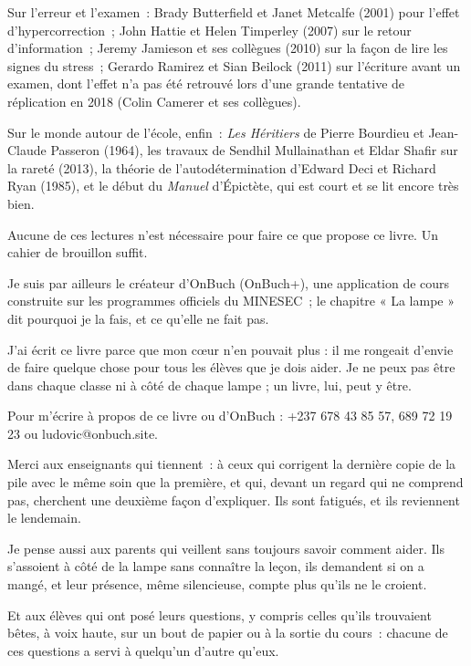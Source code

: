 \documentclass[10.5pt,twoside,openright]{book}
\newcommand{\chapitresn}[1]{\cleardoublepage\markright{#1}\thispagestyle{plain}\vspace*{2.8cm}{\noindent\LARGE\bfseries #1\par}\vspace{1.6em}\noindent\ignorespaces}
\begin{document}
Sur l’erreur et l’examen : Brady Butterfield et Janet Metcalfe (2001) pour l’effet d’hypercorrection ; John Hattie et Helen Timperley (2007) sur le retour d’information ; Jeremy Jamieson et ses collègues (2010) sur la façon de lire les signes du stress ; Gerardo Ramirez et Sian Beilock (2011) sur l’écriture avant un examen, dont l’effet n’a pas été retrouvé lors d’une grande tentative de réplication en 2018 (Colin Camerer et ses collègues).

Sur le monde autour de l’école, enfin : \emph{Les Héritiers} de Pierre Bourdieu et Jean-Claude Passeron (1964), les travaux de Sendhil Mullainathan et Eldar Shafir sur la rareté (2013), la théorie de l’autodétermination d’Edward Deci et Richard Ryan (1985), et le début du \emph{Manuel} d’Épictète, qui est court et se lit encore très bien.

Aucune de ces lectures n’est nécessaire pour faire ce que propose ce livre. Un cahier de brouillon suffit.

Je suis par ailleurs le créateur d’OnBuch (OnBuch+), une application de cours construite sur les programmes officiels du MINESEC ; le chapitre « La lampe » dit pourquoi je la fais, et ce qu’elle ne fait pas.

J’ai écrit ce livre parce que mon cœur n’en pouvait plus : il me rongeait d’envie de faire quelque chose pour tous les élèves que je dois aider. Je ne peux pas être dans chaque classe ni à côté de chaque lampe ; un livre, lui, peut y être.

Pour m’écrire à propos de ce livre ou d’OnBuch : +237 678 43 85 57, 689 72 19 23 ou ludovic@onbuch.site.


\chapitresn{Remerciements}

Merci aux enseignants qui tiennent : à ceux qui corrigent la dernière copie de la pile avec le même soin que la première, et qui, devant un regard qui ne comprend pas, cherchent une deuxième façon d’expliquer. Ils sont fatigués, et ils reviennent le lendemain.

Je pense aussi aux parents qui veillent sans toujours savoir comment aider. Ils s’assoient à côté de la lampe sans connaître la leçon, ils demandent si on a mangé, et leur présence, même silencieuse, compte plus qu’ils ne le croient.

Et aux élèves qui ont posé leurs questions, y compris celles qu’ils trouvaient bêtes, à voix haute, sur un bout de papier ou à la sortie du cours : chacune de ces questions a servi à quelqu’un d’autre qu’eux.
\end{document}

